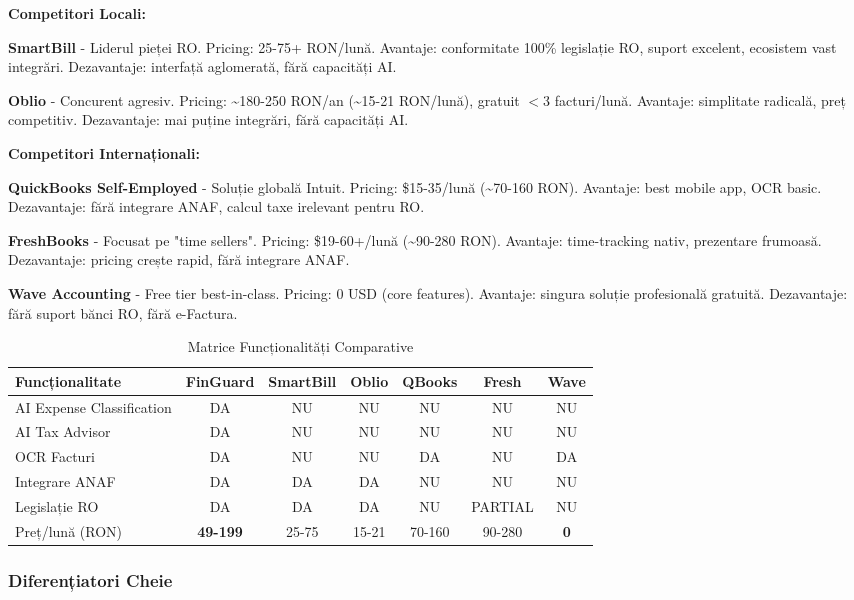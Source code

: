 \documentclass[11pt,a4paper]{article}
\begin{document}
\textbf{Competitori Locali:}

\textbf{SmartBill} - Liderul pieței RO. Pricing: 25-75+ RON/lună. Avantaje: conformitate 100\% legislație RO, suport excelent, ecosistem vast integrări. Dezavantaje: interfață aglomerată, fără capacități AI.

\textbf{Oblio} - Concurent agresiv. Pricing: \textasciitilde180-250 RON/an (\textasciitilde15-21 RON/lună), gratuit $<$3 facturi/lună. Avantaje: simplitate radicală, preț competitiv. Dezavantaje: mai puține integrări, fără capacități AI.

\textbf{Competitori Internaționali:}

\textbf{QuickBooks Self-Employed} - Soluție globală Intuit. Pricing: \$15-35/lună (\textasciitilde70-160 RON). Avantaje: best mobile app, OCR basic. Dezavantaje: fără integrare ANAF, calcul taxe irelevant pentru RO.

\textbf{FreshBooks} - Focusat pe "time sellers". Pricing: \$19-60+/lună (\textasciitilde90-280 RON). Avantaje: time-tracking nativ, prezentare frumoasă. Dezavantaje: pricing crește rapid, fără integrare ANAF.

\textbf{Wave Accounting} - Free tier best-in-class. Pricing: 0 USD (core features). Avantaje: singura soluție profesională gratuită. Dezavantaje: fără suport bănci RO, fără e-Factura.

\begin{table}[H]
\centering
\small
\begin{tabular}{|l|c|c|c|c|c|c|}
\hline
\rowcolor{lightgray}
\textbf{Funcționalitate} & \textbf{FinGuard} & \textbf{SmartBill} & \textbf{Oblio} & \textbf{QBooks} & \textbf{Fresh} & \textbf{Wave} \\
\hline
AI Expense Classification & DA & NU & NU & NU & NU & NU \\
\hline
AI Tax Advisor & DA & NU & NU & NU & NU & NU \\
\hline
OCR Facturi & DA & NU & NU & DA & NU & DA \\
\hline
Integrare ANAF & DA & DA & DA & NU & NU & NU \\
\hline
Legislație RO & DA & DA & DA & NU & PARTIAL & NU \\
\hline
Preț/lună (RON) & \textbf{49-199} & 25-75 & 15-21 & 70-160 & 90-280 & \textbf{0} \\
\hline
\end{tabular}
\caption{Matrice Funcționalități Comparative}
\end{table}

\subsubsection{Diferențiatori Cheie}
\end{document}
